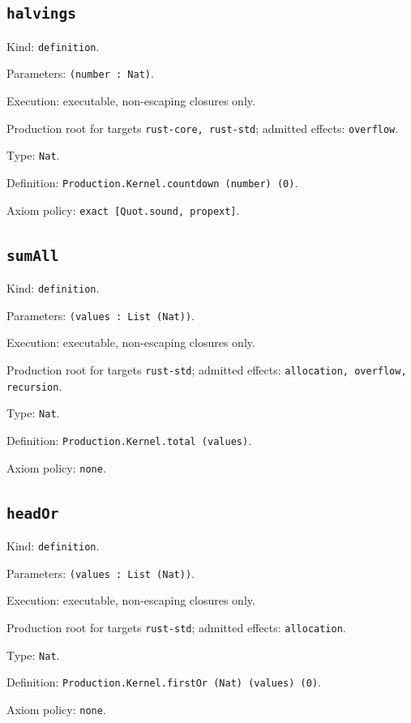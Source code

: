 \documentclass[11pt]{article}
\begin{document}
\subsection*{\texttt{halvings}}
\noindent Kind: \texttt{definition}.\par
\noindent Parameters: \texttt{(number : Nat)}.\par
\noindent Execution: executable, non-escaping closures only.\par
\noindent Production root for targets \texttt{rust-core, rust-std}; admitted effects: \texttt{overflow}.\par
\noindent Type: \texttt{Nat}.\par
\noindent Definition: \texttt{Production.Kernel.countdown (number) (0)}.\par
\noindent Axiom policy: \texttt{exact [Quot.sound, propext]}.\par
\subsection*{\texttt{sumAll}}
\noindent Kind: \texttt{definition}.\par
\noindent Parameters: \texttt{(values : List (Nat))}.\par
\noindent Execution: executable, non-escaping closures only.\par
\noindent Production root for targets \texttt{rust-std}; admitted effects: \texttt{allocation, overflow, recursion}.\par
\noindent Type: \texttt{Nat}.\par
\noindent Definition: \texttt{Production.Kernel.total (values)}.\par
\noindent Axiom policy: \texttt{none}.\par
\subsection*{\texttt{headOr}}
\noindent Kind: \texttt{definition}.\par
\noindent Parameters: \texttt{(values : List (Nat))}.\par
\noindent Execution: executable, non-escaping closures only.\par
\noindent Production root for targets \texttt{rust-std}; admitted effects: \texttt{allocation}.\par
\noindent Type: \texttt{Nat}.\par
\noindent Definition: \texttt{Production.Kernel.firstOr (Nat) (values) (0)}.\par
\noindent Axiom policy: \texttt{none}.\par
\end{document}
